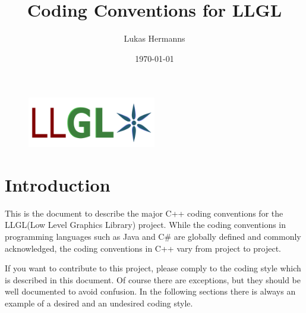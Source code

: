 \documentclass{article}
\title{Coding Conventions for LLGL}
\author{Lukas Hermanns}
\date{\today}
\begin{document}

\def\LLGL{\textcolor{darkBlueColor}{LLGL}\xspace}


\maketitle



\begin{figure}[ht]
	\centering
	\includegraphics[width=0.5\textwidth]{../LLGL_Logo.pdf}
\end{figure}

\section*{Introduction}

This is the document to describe the major C++ coding conventions for the \LLGL (Low Level Graphics Library) project.
While the coding conventions in programming languages such as Java and C\# are globally defined and commonly acknowledged,
the coding conventions in C++ vary from project to project.

If you want to contribute to this project, please comply to the coding style which is described in this document.
Of course there are exceptions, but they should be well documented to avoid confusion.
In the following sections there is always an example of a desired and an undesired coding style.


\end{document}
